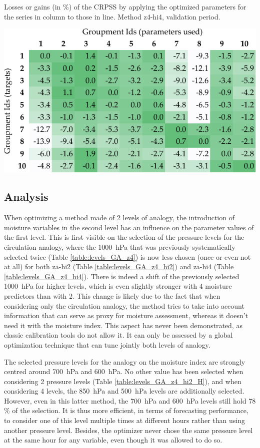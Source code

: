 \documentclass[5p]{elsarticle}
\begin{document}
\begin{table}[htb]
	\caption{Losses or gains (in \%) of the CRPSS by applying the optimized parameters for the series in column to those in line. Method z4-hi4, validation period.}
	\centerline{\includegraphics[width=\linewidth]{figures/table_crossing_z4-hi4_valid.pdf}}
	\label{table:crossing_z4-hi4_valid}
\end{table}


\subsection{Analysis}

When optimizing a method made of 2 levels of analogy, the introduction of moisture variables in the second level has an influence on the parameter values of the first level. This is first visible on the selection of the pressure levels for the circulation analogy, where the 1000~hPa that was previously systematically selected twice (Table \ref{table:levels_GA_z4}) is now less chosen (once or even not at all) for both za-hi2 (Table \ref{table:levels_GA_z4_hi2}) and za-hi4 (Table \ref{table:levels_GA_z4_hi4}). There is indeed a shift of the previously selected 1000~hPa for higher levels, which is even slightly stronger with 4 moisture predictors than with 2. This change is likely due to the fact that when considering only the circulation analogy, the method tries to take into account information that can serve as proxy for moisture assessment, whereas it doesn't need it with the moisture index. This aspect has never been demonstrated, as classic calibration tools do not allow it. It can only be assessed by a global optimization technique that can tune jointly both levels of analogy. 

The selected pressure levels for the analogy on the moisture index are strongly centred around 700~hPa and 600~hPa. No other value has been selected when considering 2 pressure levels (Table \ref{table:levels_GA_z4_hi2_H}), and when considering 4 levels, the 850~hPa and 500~hPa levels are additionally selected. However, even in this latter method, the 700~hPa and 600~hPa levels still hold 78 \% of the selection. It is thus more efficient, in terms of forecasting performance, to consider one of this level multiple times at different hours rather than using another pressure level. Besides, the optimizer never chose the same pressure level at the same hour for any variable, even though it was allowed to do so.
\end{document}
